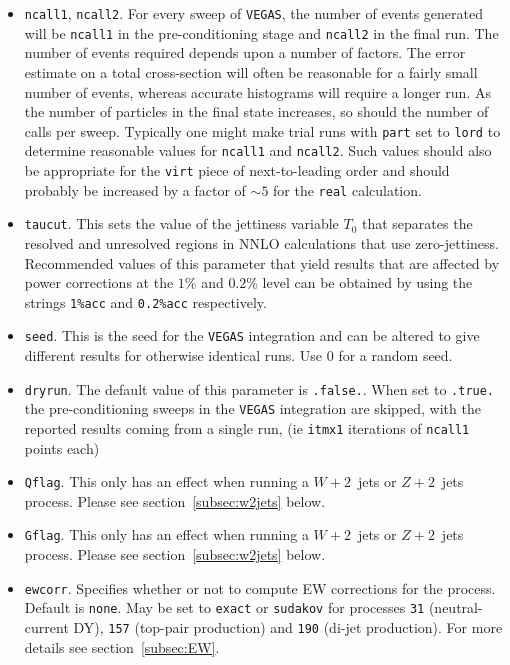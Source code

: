 \documentclass{article}
\begin{document}
\begin{itemize}
\item {\tt ncall1}, {\tt ncall2}. For every sweep of {\tt VEGAS},
the number of events generated will be {\tt ncall1} in the
pre-conditioning stage and {\tt ncall2} in the final run. The number
of events required depends upon a number of factors. The error
estimate on a total cross-section will often be reasonable for a
fairly small number of events, whereas accurate histograms will
require a longer run. As the number of particles in the final state
increases, so should the number of calls per sweep. Typically one
might make trial runs with {\tt part} set to {\tt lord} to determine
reasonable values for {\tt ncall1} and {\tt ncall2}. Such values
should also be appropriate for the {\tt virt} piece of
next-to-leading order and should probably be increased by a factor of
$\sim 5$ for the {\tt real} calculation.

\item {\tt taucut}. This sets the value of the jettiness variable
$T_0$ that separates the resolved and unresolved regions in NNLO
calculations that use zero-jettiness.  Recommended values of this
parameter that yield results that are affected by power corrections
at the $1$\% and $0.2$\% level can be obtained by using the
strings {\tt 1\%acc} and {\tt 0.2\%acc} respectively.

\item {\tt seed}. This is the seed for the {\tt VEGAS} integration
and can be altered to give different results for otherwise identical
runs. Use 0 for a random seed.

\item {\tt dryrun}. The default value of this parameter is
{\tt .false.}. When set to {\tt .true.} the pre-conditioning sweeps
in the {\tt VEGAS} integration are skipped, with the reported
results coming from a single run, (ie {\tt itmx1} iterations of 
{\tt ncall1} points each)
\item {\tt Qflag}. This only has an effect when running a
$W+2$~jets or $Z+2$~jets process. Please see section~\ref{subsec:w2jets}
below.

\item {\tt Gflag}. This only has an effect when running a
$W+2$~jets or $Z+2$~jets process. Please see section~\ref{subsec:w2jets}
below.

\item {\tt ewcorr}. Specifies whether or not to compute EW corrections
for the process.  Default is {\tt none}.  May be set to {\tt exact}
or {\tt sudakov} for processes {\tt 31} (neutral-current DY),
{\tt 157} (top-pair production) and {\tt 190} (di-jet production).
For more details see section~\ref{subsec:EW}.


\end{itemize}
\end{document}
